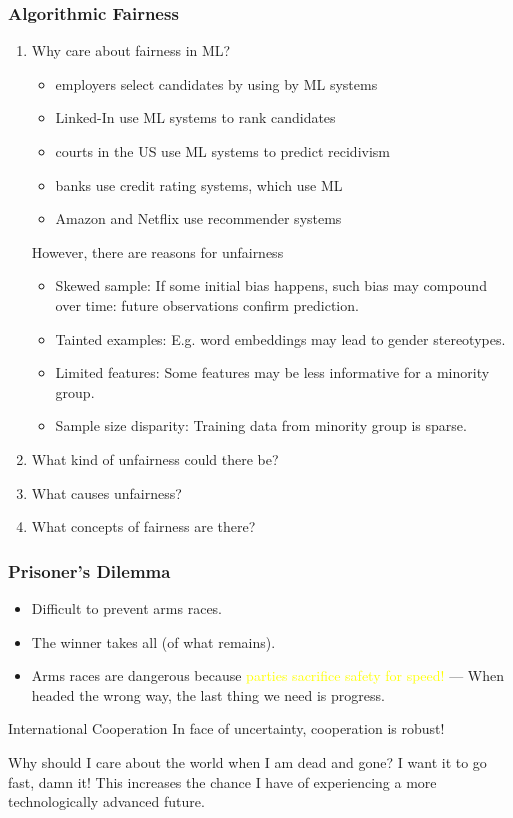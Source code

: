 \documentclass[UTF8,11pt,colorlinks,compress,openany]{beamer}%
\begin{document}
\begin{frame}\frametitle{Algorithmic Fairness}
\begin{enumerate}
	\item Why care about fairness in ML?
	\begin{itemize}
		\item employers select candidates by using by ML systems
		\item Linked-In use ML systems to rank candidates
		\item courts in the US use ML systems to predict recidivism
		\item banks use credit rating systems, which use ML
		\item Amazon and Netflix use recommender systems
	\end{itemize}
	However, there are reasons for unfairness
	\begin{itemize}
		\item Skewed sample: If some initial bias happens, such bias may compound over time: future observations confirm prediction.
		\item Tainted examples: E.g. word embeddings may lead to gender stereotypes.
		\item Limited features: Some features may be less informative for a minority group.
		\item Sample size disparity: Training data from minority group is sparse.
	\end{itemize}
	\item What kind of unfairness could there be?
	\item What causes unfairness?
	\item What concepts of fairness are there?
\end{enumerate}
\end{frame}

\begin{frame}\frametitle{Prisoner's Dilemma}
\begin{itemize}
	\item Difficult to prevent arms races.
	\item The winner takes all (of what remains).
	\item Arms races are dangerous because \textcolor{yellow}{parties sacrifice safety for speed!} --- When headed the wrong way, the last thing we need is progress.
\end{itemize}
\begin{block}{International Cooperation}
In face of uncertainty, cooperation is robust!
\end{block}
Why should I care about the world when I am dead and gone? I want it to go fast, damn it! This increases the chance I have of experiencing a more technologically advanced future.
\end{frame}
\end{document}
